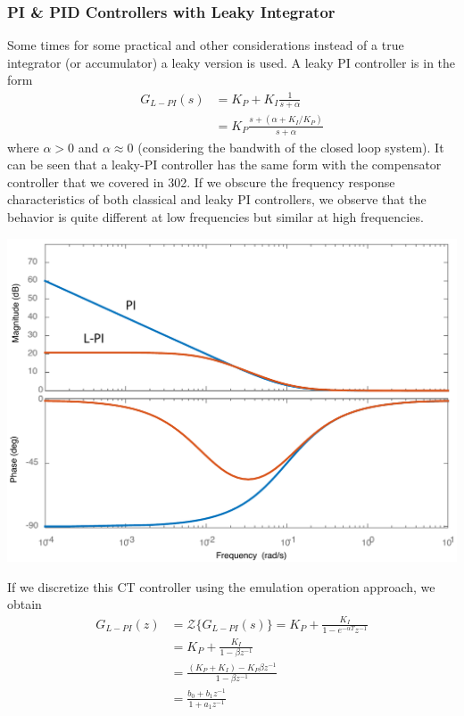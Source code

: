 \documentclass[twoside]{article}
\begin{document}
\subsubsection*{PI \& PID Controllers with Leaky Integrator}
%
Some times for some practical and other considerations
instead of a true integrator (or accumulator) a leaky version 
is used. A leaky PI controller is in the form
%
\begin{align*}
  G_{L-PI}(s) &= K_P + K_I \frac{1}{s + \alpha} \\
  &= K_P \frac{s + ( \alpha + K_I / K_P) }{s + \alpha}
\end{align*}
%
where $\alpha > 0$ and $\alpha \approx 0$ (considering the bandwith 
of the closed loop system). It can be seen that a leaky-PI controller
has the same form with the compensator controller that we covered in 
302. If we obscure the frequency response characteristics of both
classical and leaky PI controllers, we observe that the behavior is
quite different at low frequencies but similar at high frequencies.
%
    \begin{center}
\begin{minipage}[h]{0.6\linewidth}
    \begin{center}
      \includegraphics[width=\textwidth]{PI}
    \end{center}
\end{minipage}
    \end{center}
%
If we discretize this CT controller
using the emulation operation approach, we obtain
%
\begin{align*}
  G_{L-PI}(z) &= \mathcal{Z} \lbrace G_{L-PI}(s) \rbrace  = K_P + 
  \frac{K_I}{1 - e^{-\alpha T} z^{-1}} \\
  &= K_P  + \frac{K_I}{1 - \beta z^{-1}} 
  \\
  &= \frac{(K_P  + K_I) - K_P \beta z^{-1} }{1 - \beta z^{-1}} 
  \\
 &= \frac{ b_0 + b_1 z^{-1}}{1 + a_1 z^{-1}} 
\end{align*}
\end{document}
